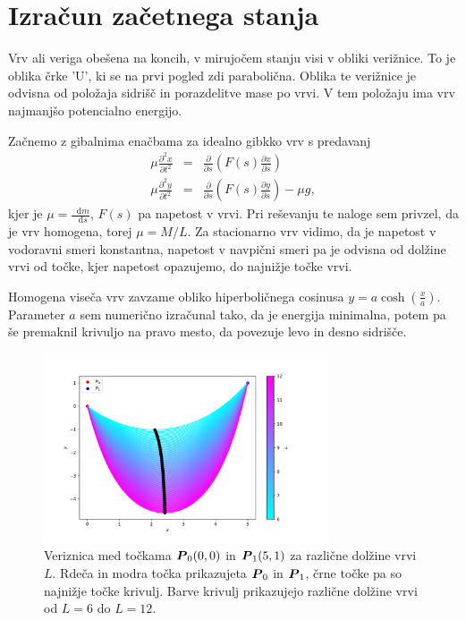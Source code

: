 \documentclass[a4paper, 12pt, slovene]{article}
\newcommand*\diff{\mathop{}\!\mathrm{d}}
\numberwithin{equation}{section}
\newcommand{\pd}{\partial}
\newcommand{\bi}[1]{\hbox{\boldmath{$#1$}}}
\begin{document}
\section{Izračun začetnega stanja}
Vrv ali veriga obešena na koncih, v mirujočem stanju visi v obliki verižnice. To je oblika črke 'U', ki se na prvi pogled zdi parabolična. Oblika te verižnice je odvisna od položaja sidrišč in porazdelitve mase po vrvi. V tem položaju ima vrv najmanjšo potencialno energijo. \par\vspace{5mm}

Začnemo z gibalnima enačbama za idealno gibkko vrv s predavanj
\begin{eqnarray}
\mu \frac{\pd^2 x}{\pd t^2} &=& \frac{\pd}{\pd s}\left(F(s)\frac{\pd x}{\pd s}\right) \\
\mu \frac{\pd^2 y}{\pd t^2} &=& \frac{\pd}{\pd s}\left(F(s)\frac{\pd y}{\pd s}\right) - \mu g,
\end{eqnarray}
kjer je $\mu = \frac{\diff m}{\diff s}$, $F(s)$ pa napetost v vrvi. Pri reševanju te naloge sem privzel, da je vrv homogena, torej $\mu = M/L$. Za stacionarno vrv vidimo, da je napetost v vodoravni smeri konstantna, napetost v navpični smeri pa je odvisna od dolžine vrvi od točke, kjer napetost opazujemo, do najnižje točke vrvi. \par\vspace{5mm}

Homogena viseča vrv zavzame obliko hiperboličnega cosinusa $y = a\cosh\left(\frac{x}{a}\right)$. Parameter $a$ sem numerično izračunal tako, da je energija minimalna, potem pa še premaknil krivuljo na pravo mesto, da povezuje levo in desno sidrišče. 

\begin{figure}[H]
\centering
\includegraphics[width=0.75\textwidth]{grafi/catenary-L6.0-12.0-P00.0-0.0-P15.0-1.0.pdf}
\caption{Veriznica med točkama ${\bi P_0}(0, 0)$ in ${\bi P_1}(5, 1)$ za različne dolžine vrvi $L$. Rdeča in modra točka prikazujeta  ${\bi P_0}$ in ${\bi P_1}$, črne točke pa so najnižje točke krivulj. Barve krivulj prikazujejo različne dolžine vrvi od $L=6$ do $L=12$.}
\label{f:veriznice}
\end{figure}
\end{document}
